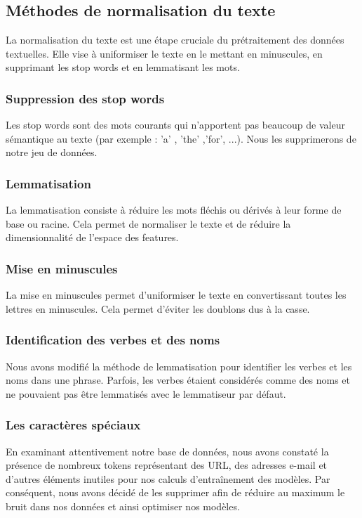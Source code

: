 \subsection{Méthodes de normalisation du texte}
La normalisation du texte est une étape cruciale du prétraitement des données textuelles. Elle vise à uniformiser le texte en le mettant en minuscules, en supprimant les stop words et en lemmatisant les mots.

\subsubsection*{Suppression des stop words}

Les stop words sont des mots courants qui n'apportent pas beaucoup de valeur sémantique au texte (par exemple : 'a' , 'the' ,'for', ...). Nous les supprimerons de notre jeu de données.

\subsubsection*{Lemmatisation}

La lemmatisation consiste à réduire les mots fléchis ou dérivés à leur forme de base ou racine. Cela permet de normaliser le texte et de réduire la dimensionnalité de l'espace des features.

\subsubsection*{Mise en minuscules}

La mise en minuscules permet d'uniformiser le texte en convertissant toutes les lettres en minuscules. Cela permet d'éviter les doublons dus à la casse.

\subsubsection*{Identification des verbes et des noms}

Nous avons modifié la méthode de lemmatisation pour identifier les verbes et les noms dans une phrase. Parfois, les verbes étaient considérés comme des noms et ne pouvaient pas être lemmatisés avec le lemmatiseur par défaut.

\subsubsection*{Les caractères spéciaux}

En examinant attentivement notre base de données, nous avons constaté la présence de nombreux tokens représentant des URL, des adresses e-mail et d’autres éléments inutiles pour nos calculs d’entraînement des modèles. 
Par conséquent, nous avons décidé de les supprimer afin de réduire au maximum le bruit dans nos données et ainsi optimiser nos modèles.

